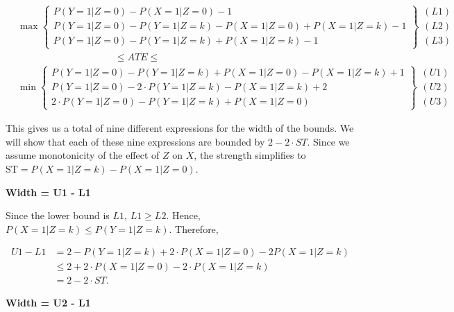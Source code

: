 \documentclass[AMA,STIX1COL,]{WileyNJD-v2}
\begin{document}
\[
  \begin{aligned}
    &\max
      \begin{Bmatrix}
        P(Y = 1 | Z = 0) - P(X = 1 | Z = 0) - 1 \\
        P(Y = 1 | Z = 0) - P(Y = 1 | Z = k) - P(X = 1 | Z = 0) + P(X = 1 | Z = k) - 1 \\
        P(Y = 1 | Z = 0) - P(Y = 1 | Z = k) + P(X = 1 | Z = k) - 1
      \end{Bmatrix} 
      \begin{matrix} (L1) \\ (L2) \\ (L3) \end{matrix}  \\
    &\qquad \qquad \qquad \qquad \qquad\le ATE \le \\
    &\min
      \begin{Bmatrix}
        P(Y = 1 | Z = 0) - P(Y = 1 | Z = k) + P(X = 1 | Z = 0) - P(X = 1 | Z = k) + 1\\
        P(Y = 1 | Z = 0) - 2\cdot P(Y = 1 | Z = k) - P(X = 1 | Z = k) + 2 \\
        2\cdot P(Y = 1 | Z = 0) - P(Y = 1 | Z = k) + P(X = 1 | Z = 0)
      \end{Bmatrix}
      \begin{matrix} (U1) \\ (U2) \\ (U3) \end{matrix}
  \end{aligned}
\]

This gives us a total of nine different expressions for the width of the
bounds. We will show that each of these nine expressions are bounded by
\(2 - 2\cdot ST\). Since we assume monotonicity of the effect of \(Z\)
on \(X\), the strength simplifies to
\(\text{ST} = P(X = 1 | Z = k) - P(X = 1 | Z = 0)\).

\textbf{Width = U1 - L1}

Since the lower bound is \(L1\), \(L1 \ge L2\). Hence,
\(P(X = 1 | Z = k) \le P(Y = 1 | Z = k)\). Therefore,

\[\begin{aligned}
U1 - L1 &= 2 - P(Y = 1 | Z = k) + 2\cdot P(X = 1 | Z = 0) - 2P(X = 1 | Z = k) \\
        &\le 2 + 2\cdot P(X = 1 | Z = 0) - 2\cdot P(X = 1 | Z = k) \\
        &= 2 - 2\cdot ST.
\end{aligned}\]

\textbf{Width = U2 - L1}
\end{document}
